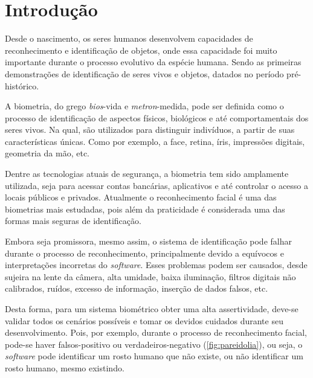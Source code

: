 
\chapter{Introdução}\label{cap:introducao}

Desde o nascimento, os seres humanos desenvolvem capacidades de reconhecimento e 
identificação de objetos, onde essa capacidade foi muito 
importante durante o processo evolutivo da espécie humana. Sendo as primeiras 
demonstrações de identificação de seres vivos e objetos, datados no período 
pré-histórico.

A biometria, do grego \textit{bios}-vida e \textit{metron}-medida, pode ser 
definida como o processo de identificação de aspectos físicos, biológicos e até 
comportamentais dos seres vivos. Na qual, são utilizados para distinguir indivíduos, 
a partir de suas características únicas. Como por exemplo, a face, retina, 
íris, impressões digitais, geometria da mão, etc.

Dentre as tecnologias atuais de segurança, a biometria tem sido amplamente 
utilizada, seja para acessar contas bancárias, aplicativos e até controlar 
o acesso a locais públicos e privados. Atualmente o reconhecimento facial 
é uma das biometrias mais estudadas, pois além da praticidade é considerada uma 
das formas mais seguras de identificação. 

Embora seja promissora, mesmo assim, o sistema de identificação pode falhar durante o 
processo de reconhecimento, principalmente devido a equívocos e interpretações 
incorretas do \textit{software}. Esses problemas podem ser causados,
desde sujeira na lente da câmera, alta umidade, baixa iluminação, filtros digitais 
não calibrados, ruídos, excesso de informação, inserção de dados falsos, etc.

Desta forma, para um sistema biométrico obter uma alta assertividade, 
deve-se validar todos os cenários possíveis e tomar os devidos cuidados durante seu 
desenvolvimento. Pois, por exemplo, durante o processo de reconhecimento facial,
pode-se haver falsos-positivo ou verdadeiros-negativo (\autoref{fig:pareidolia}), 
ou seja, o \textit{software} pode identificar um rosto humano que não existe, 
ou não identificar um rosto humano, mesmo existindo.


